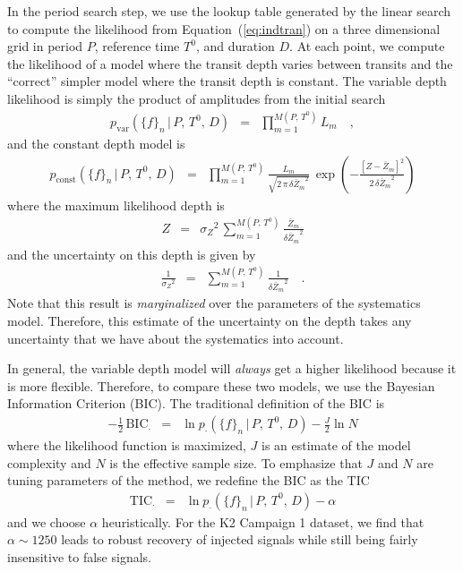 \documentclass[12pt,preprint]{aastex}
\newcommand{\Eq}[1]{Equation~(\ref{eq:#1})}
\newcommand{\eq}[1]{\Eq{#1}}
\newcommand{\eqlabel}[1]{\label{eq:#1}}
\newcommand{\BIC}{{\ensuremath{\mathrm{BIC}}}}
\newcommand{\TIC}{{\ensuremath{\mathrm{TIC}}}}
\newcommand{\flux}{{\ensuremath{f}}}
\newcommand{\period}{{\ensuremath{P}}}
\newcommand{\phase}{{\ensuremath{T^0}}}
\newcommand{\duration}{{\ensuremath{D}}}
\newcommand{\depth}{{\ensuremath{Z}}}
\begin{document}
In the period search step, we use the lookup table generated by the linear
search to compute the likelihood from \eq{indtran} on a three dimensional
grid in period \period, reference time \phase, and duration \duration.
At each point, we compute the likelihood of a model where the transit depth
varies between transits and the ``correct'' simpler model where the transit
depth is constant.
The variable depth likelihood is simply the product of amplitudes from the
initial search
\begin{eqnarray}
p_\mathrm{var}(\{\flux\}_n\,|\,\period,\,\phase,\,\duration) &=&
\prod_{m=1}^{M(\period,\,\phase)} L_m \quad,
\end{eqnarray}
and the constant depth model is
\begin{eqnarray}
p_\mathrm{const}(\{\flux\}_n\,|\,\period,\,\phase,\,\duration) &=&
\prod_{m=1}^{M(\period,\,\phase)}
    \frac{L_m}{\sqrt{2\,\pi\,{\delta\bar{\depth}_m}^2}}\,\exp \left(
        -\frac{[\depth - \bar{\depth}_m]^2}{2\,{\delta\bar{\depth}_m}^2}
    \right)
\end{eqnarray}
where the maximum likelihood depth is
\begin{eqnarray}\eqlabel{periodic-depth}
\depth &=& {\sigma_\depth}^2\,\sum_{m=1}^{M(\period,\,\phase)}
    \frac{\bar{\depth}_m}{{\delta\bar{\depth}_m}^2}
\end{eqnarray}
and the uncertainty on this depth is given by
\begin{eqnarray}\eqlabel{periodic-depth-uncert}
\frac{1}{{\sigma_\depth}^2} &=& \sum_{m=1}^{M(\period,\,\phase)}
    \frac{1}{{\delta\bar{\depth}_m}^2} \quad.
\end{eqnarray}
Note that this result is \emph{marginalized} over the parameters of the
systematics model.
Therefore, this estimate of the uncertainty on the depth takes any
uncertainty that we have about the systematics into account.

In general, the variable depth model will \emph{always} get a higher
likelihood because it is more flexible.
Therefore, to compare these two models, we use the Bayesian Information
Criterion (BIC).
The traditional definition of the BIC is
\begin{eqnarray}
-\frac{1}{2}\,\BIC_\cdot &=&
    \ln p_\cdot(\{\flux\}_n\,|\,\period,\,\phase,\,\duration)
    - \frac{J}{2} \ln N
\end{eqnarray}
where the likelihood function is maximized, $J$ is an estimate of the model
complexity and $N$ is the effective sample size.
To emphasize that $J$ and $N$ are tuning parameters of the method, we
redefine the BIC as the TIC
\begin{eqnarray}
\TIC_\cdot &=&
    \ln p_\cdot(\{\flux\}_n\,|\,\period,\,\phase,\,\duration) - \alpha
\end{eqnarray}
and we choose $\alpha$ heuristically.
For the K2 Campaign 1 dataset, we find that $\alpha \sim 1250$ leads to robust
recovery of injected signals while still being fairly insensitive to false
signals.
\end{document}
